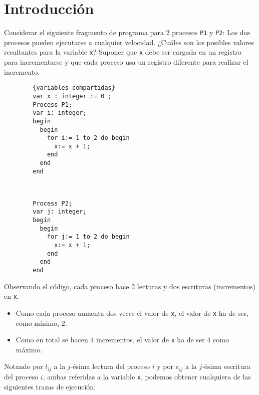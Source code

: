 \section{Introducción}

\begin{ejercicio}
    Considerar el siguiente fragmento de programa para 2 procesos \verb|P1| y \verb|P2|: Los dos procesos
    pueden ejecutarse a cualquier velocidad. ¿Cuáles son los posibles valores resultantes para la
    variable \verb|x|? Suponer que \verb|x| debe ser cargada en un registro para incrementarse y que cada
    proceso usa un registro diferente para realizar el incremento.
    \setlength{\columnsep}{2cm} %
    \begin{multicols}{2}
        \begin{verbatim}
        {variables compartidas}
        var x : integer := 0 ;
        Process P1;
        var i: integer;
        begin
          begin
            for i:= 1 to 2 do begin
              x:= x + 1;
            end
          end
        end
        \end{verbatim}
        
        \begin{verbatim}
            

        Process P2;
        var j: integer;
        begin
          begin
            for j:= 1 to 2 do begin
              x:= x + 1;
            end
          end
        end
        \end{verbatim}
    \end{multicols}

Observando el código, cada proceso hace 2 lecturas y dos escrituras (incrementos) en \verb|x|.
\begin{itemize}
    \item Como cada proceso aumenta dos veces el valor de \verb|x|, el valor de \verb|x| ha de ser, como mínimo, $2$.
    \item Como en total se hacen 4 incrementos, el valor de \verb|x| ha de ser $4$ como máximo.
\end{itemize}

Notando por $l_{ij}$ a la $j$-ésima lectura del proceso $i$ y por $e_{ij}$ a la $j$-ésima escritura del proceso $i$, ambas referidas a la variable \verb|x|, podemos obtener cualquiera de las siguientes trazas de ejecución:


\end{ejercicio}
